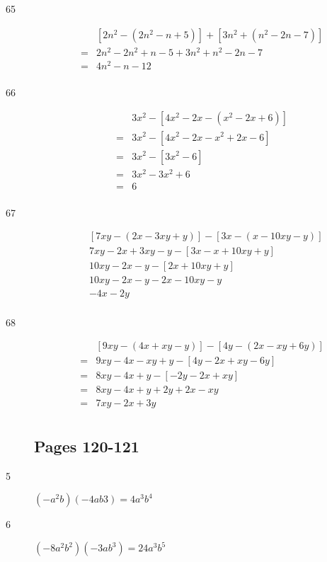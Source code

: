 \documentclass[fleqn,addpoints]{exam}
\begin{document}
\begin{description}
\item[65]
\begin{eqnarray*}
&& [2n^2 - (2n^2 - n + 5)] + [3n^2 + (n^2 - 2n - 7)] \\
&=& 2n^2 -2n^2 + n - 5 + 3n^2 + n^2 - 2n - 7 \\
&=& 4n^2 - n - 12 \\
\end{eqnarray*}

\item[66]
\begin{eqnarray*}
&& 3x^2 - [4x^2 - 2x - (x^2 - 2x + 6)] \\
&=& 3x^2 - [4x^2 - 2x - x^2 + 2x - 6] \\
&=& 3x^2 - [3x^2 - 6] \\
&=& 3x^2 - 3x^2 + 6 \\
&=& 6 \\
\end{eqnarray*}

\item[67]
\begin{eqnarray*}
&& [7xy - (2x - 3xy + y)] - [3x - (x - 10xy - y)] \\
&& 7xy - 2x + 3xy - y - [3x - x + 10xy + y] \\
&& 10xy - 2x - y - [2x + 10xy + y] \\
&& 10xy - 2x - y - 2x - 10xy - y \\
&& -4x - 2y \\
\end{eqnarray*}

\item[68]
\begin{eqnarray*}
&& [9xy - (4x + xy - y)] - [4y - (2x - xy + 6y)] \\
&=& 9xy - 4x - xy + y - [4y - 2x + xy - 6y] \\
&=& 8xy - 4x + y - [-2y - 2x + xy] \\
&=& 8xy - 4x + y + 2y + 2x - xy \\
&=& 7xy - 2x + 3y \\
\end{eqnarray*}

\subsection{Pages 120-121}

\item[5]
\( (-a^2b)(-4ab3) = 4a^3b^4 \)

\item[6]
\( (-8a^2b^2)(-3ab^3) = 24a^3b^5 \)


\end{description}
\end{document}
